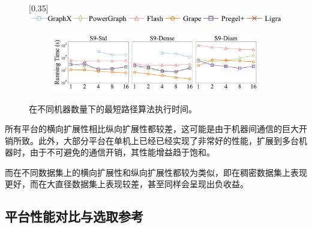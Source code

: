 \begin{table}[h]\centering
    \def\arraystretch{1.5}
   \caption{横向扩展性加速倍数}
   \label{tab:exp_scalability_machines}
   \tiny
\end{table}

\begin{figure}[h]\centering

    \scalebox{0.35}[0.35]{\includegraphics{figures/vertical_scalability_legend.pdf}}
    
    \begin{subfigure}[b]{0.8\textwidth}
        \includegraphics[width=\textwidth]{figures/sssp_horizontal_scalability_9.pdf}
    \end{subfigure}

    \caption{在不同机器数量下的最短路径算法执行时间。}
    \label{fig:exp_scalability_machines_9}
\end{figure}

所有平台的横向扩展性相比纵向扩展性都较差，这可能是由于机器间通信的巨大开销所致。此外，大部分平台在单机上已经已经实现了非常好的性能，扩展到多台机器时，由于不可避免的通信开销，其性能增益趋于饱和。

而在不同数据集上的横向扩展性和纵向扩展性都较为类似，即在稠密数据集上表现更好，而在大直径数据集上表现较差，甚至同样会呈现出负收益。

\subsection{平台性能对比与选取参考}

